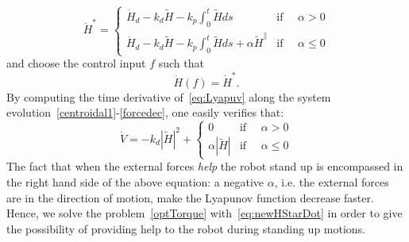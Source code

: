 \begin{equation}
\label{eq:newHStarDot}
  \dot{H}^* =
  \begin{cases}
    \dot{H}_d - k_d\tilde{H} -k_p \int_0^t\tilde{H} ds & \text{if }\quad  \alpha > 0
    \\
   \dot{H}_d - k_d\tilde{H} -k_p \int_0^t\tilde{H} ds +\alpha\tilde{H}^\parallel & \text{if }\quad  \alpha \leq 0
  \end{cases}
\end{equation}
and choose the control input $f$ such that 
\[ \dot{H}(f) = \dot{H}^*. \]
By computing the time derivative of~\eqref{eq:Lyapuv} along the system evolution~\eqref{centroidal1}-\eqref{forcedec}, one easily verifies that:
\begin{equation}
\label{eq:newVDot}
 \dot{V} =-k_d|\tilde{H}|^2 +
  \begin{cases}
   0 & \text{if }\quad  \alpha > 0
    \\
   \alpha|\tilde{H}| & \text{if }\quad  \alpha \leq 0
  \end{cases}
\end{equation}
The fact that when the external forces \emph{help} the robot stand up is encompassed in the right hand side of the above equation:  a negative $\alpha$, i.e. the external forces are in the direction of motion, make the Lyapunov function decrease faster. Hence, we solve the problem~\eqref{optTorque} with~\eqref{eq:newHStarDot} in order to give the possibility of providing help to the robot during standing up motions.
